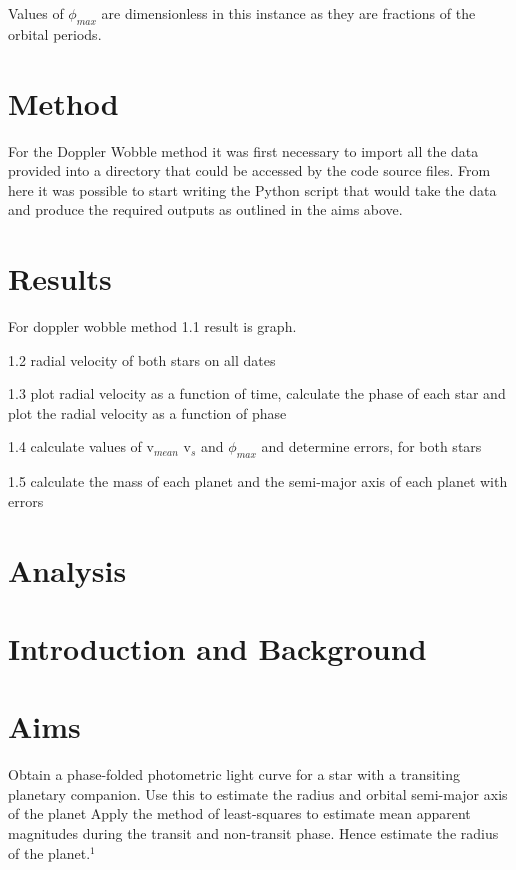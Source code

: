 \documentclass[]{article}
\begin{document}
  Values of $\phi_{max}$ are dimensionless in this instance as they are
  fractions of the orbital periods.






\section*{Method}
For the Doppler Wobble method it was first necessary to 
import all the data provided into a directory that could be 
accessed by the code source files. From here it was possible to start
writing the Python script that would take the data and produce the required 
outputs as outlined in the aims above.




\section*{Results}
For doppler wobble method 1.1 result is graph. \par
1.2 radial velocity of both stars on all dates\par
1.3 plot radial velocity as a function of time, calculate the phase
of each star and plot the radial velocity as a function of phase\par
1.4 calculate values of v$_{mean}$ v$_{s}$ and $\phi_{max}$ and determine errors,
for both stars\par
1.5 calculate the mass of each planet and the semi-major axis of each planet 
with errors\par



\section*{Analysis}





\newpage
\section*{Introduction and Background}

\section*{Aims}

Obtain a phase-folded photometric light curve for a star with a transiting 
planetary companion. Use this to estimate the radius and orbital semi-major 
axis of the planet
Apply the method of least-squares to estimate mean apparent magnitudes 
during the transit and non-transit phase. Hence estimate the radius of the planet.$^1$
\end{document}
